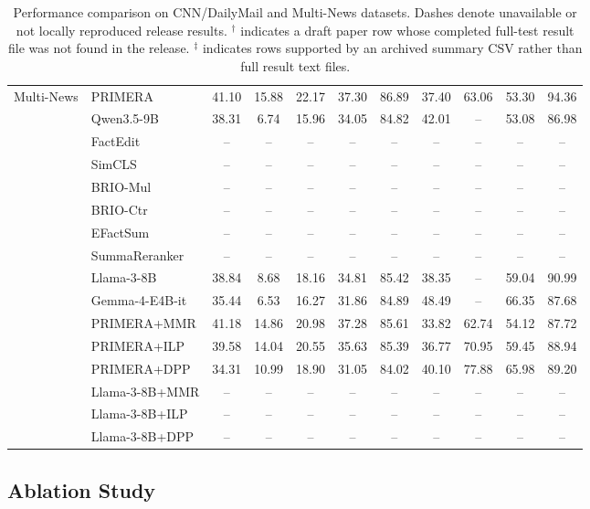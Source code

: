 \documentclass[11pt]{article}
\begin{document}
\begin{table}[htbp]
{\begin{tabular}{@{} l l cccc c cccc @{}}
\midrule

\multirow{16}{*}{Multi-News}
 & PRIMERA            & 41.10 & 15.88 & 22.17 & 37.30 & 86.89 & 37.40 & 63.06 & 53.30 & 94.36 \\
 & Qwen3.5-9B        & 38.31 & 6.74 & 15.96 & 34.05 & 84.82 & 42.01 & -- & 53.08 & 86.98 \\
 & FactEdit        & -- & -- & -- & -- & -- & -- & -- & -- & -- \\
 & SimCLS          & -- & -- & -- & -- & -- & -- & -- & -- & -- \\
 & BRIO-Mul        & -- & -- & -- & -- & -- & -- & -- & -- & -- \\
 & BRIO-Ctr        & -- & -- & -- & -- & -- & -- & -- & -- & -- \\
 & EFactSum        & -- & -- & -- & -- & -- & -- & -- & -- & -- \\
 & SummaReranker   & -- & -- & -- & -- & -- & -- & -- & -- & -- \\
 & Llama-3-8B      & 38.84 & 8.68 & 18.16 & 34.81 & 85.42 & 38.35 & -- & 59.04 & 90.99 \\
 & Gemma-4-E4B-it   & 35.44 & 6.53 & 16.27 & 31.86 & 84.89 & 48.49 & -- & 66.35 & 87.68 \\
 \cmidrule(l){2-11}
 & PRIMERA+MMR        & 41.18 & 14.86 & 20.98 & 37.28 & 85.61 & 33.82 & 62.74 & 54.12 & 87.72 \\
 & PRIMERA+ILP        & 39.58 & 14.04 & 20.55 & 35.63 & 85.39 & 36.77 & 70.95 & 59.45 & 88.94 \\
 & PRIMERA+DPP        & 34.31 & 10.99 & 18.90 & 31.05 & 84.02 & 40.10 & 77.88 & 65.98 & 89.20 \\
 &Llama-3-8B+MMR          & -- & -- & -- & -- & -- & -- & -- & -- & -- \\
 & Llama-3-8B+ILP          & -- & -- & -- & -- & -- & -- & -- & -- & -- \\
 & Llama-3-8B+DPP          & -- & -- & -- & -- & -- & -- & -- & -- & -- \\

\bottomrule
\end{tabular}%
}
\caption{Performance comparison on CNN/DailyMail and Multi-News datasets. Dashes denote unavailable or not locally reproduced release results. $^{\dagger}$ indicates a draft paper row whose completed full-test result file was not found in the release. $^{\ddagger}$ indicates rows supported by an archived summary CSV rather than full result text files.}
\label{tab:main_results}
\end{table}
\subsection{Ablation Study}
\end{document}
